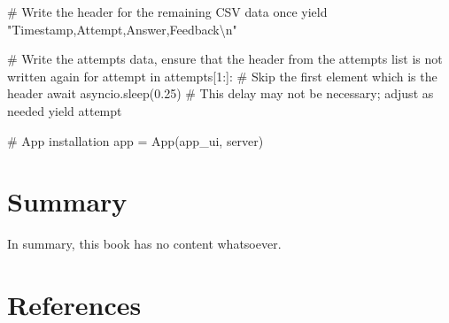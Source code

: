 \documentclass[
  letterpaper,
  DIV=11,
  numbers=noendperiod]{scrreprt}
\newenvironment{Shaded}{\begin{snugshade}}{\end{snugshade}}
\newcommand{\NormalTok}[1]{\textcolor[rgb]{0.00,0.23,0.31}{#1}}
\newlength{\cslhangindent}
\newenvironment{CSLReferences}[2] %
 {\begin{list}{}{%
  \setlength{\itemindent}{0pt}
  \setlength{\leftmargin}{0pt}
  \setlength{\parsep}{0pt}
  \ifodd #1
   \setlength{\leftmargin}{\cslhangindent}
   \setlength{\itemindent}{-1\cslhangindent}
  \fi
  \setlength{\itemsep}{#2\baselineskip}}}
 {\end{list}}
\begin{document}
\begin{Shaded}
\begin{Highlighting}[]
\NormalTok{        \# Write the header for the remaining CSV data once}
\NormalTok{        yield "Timestamp,Attempt,Answer,Feedback\textbackslash{}n"}
        
\NormalTok{        \# Write the attempts data, ensure that the header from the attempts list is not written again}
\NormalTok{        for attempt in attempts[1:]:  \# Skip the first element which is the header}
\NormalTok{            await asyncio.sleep(0.25)  \# This delay may not be necessary; adjust as needed}
\NormalTok{            yield attempt}


\NormalTok{\# App installation}
\NormalTok{app = App(app\_ui, server)}
\end{Highlighting}
\end{Shaded}


\chapter{Summary}\label{summary}

In summary, this book has no content whatsoever.


\chapter*{References}\label{references}


\label{refs}
\begin{CSLReferences}{0}{1}
\end{CSLReferences}
\end{document}
